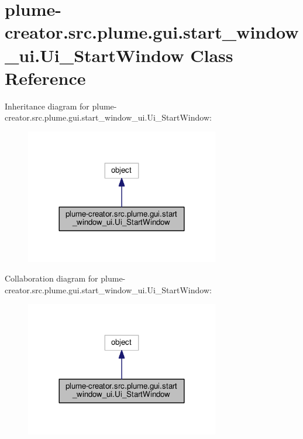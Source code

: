 \hypertarget{classplume-creator_1_1src_1_1plume_1_1gui_1_1start__window__ui_1_1_ui___start_window}{}\section{plume-\/creator.src.\+plume.\+gui.\+start\+\_\+window\+\_\+ui.\+Ui\+\_\+\+Start\+Window Class Reference}
\label{classplume-creator_1_1src_1_1plume_1_1gui_1_1start__window__ui_1_1_ui___start_window}


Inheritance diagram for plume-\/creator.src.\+plume.\+gui.\+start\+\_\+window\+\_\+ui.\+Ui\+\_\+\+Start\+Window\+:\nopagebreak
\begin{figure}[H]
\begin{center}
\leavevmode
\includegraphics[width=240pt]{classplume-creator_1_1src_1_1plume_1_1gui_1_1start__window__ui_1_1_ui___start_window__inherit__graph}
\end{center}
\end{figure}


Collaboration diagram for plume-\/creator.src.\+plume.\+gui.\+start\+\_\+window\+\_\+ui.\+Ui\+\_\+\+Start\+Window\+:\nopagebreak
\begin{figure}[H]
\begin{center}
\leavevmode
\includegraphics[width=240pt]{classplume-creator_1_1src_1_1plume_1_1gui_1_1start__window__ui_1_1_ui___start_window__coll__graph}
\end{center}
\end{figure}

